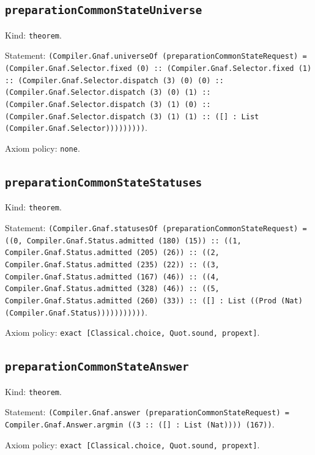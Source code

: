 \documentclass[11pt]{article}
\begin{document}
\subsection*{\texttt{preparationCommonStateUniverse}}
\noindent Kind: \texttt{theorem}.\par
\noindent Statement: \texttt{(Compiler.Gnaf.universeOf (preparationCommonStateRequest) = (Compiler.Gnaf.Selector.fixed (0) :: (Compiler.Gnaf.Selector.fixed (1) :: (Compiler.Gnaf.Selector.dispatch (3) (0) (0) :: (Compiler.Gnaf.Selector.dispatch (3) (0) (1) :: (Compiler.Gnaf.Selector.dispatch (3) (1) (0) :: (Compiler.Gnaf.Selector.dispatch (3) (1) (1) :: ([] : List (Compiler.Gnaf.Selector)))))))))}.\par
\noindent Axiom policy: \texttt{none}.\par
\subsection*{\texttt{preparationCommonStateStatuses}}
\noindent Kind: \texttt{theorem}.\par
\noindent Statement: \texttt{(Compiler.Gnaf.statusesOf (preparationCommonStateRequest) = ((0, Compiler.Gnaf.Status.admitted (180) (15)) :: ((1, Compiler.Gnaf.Status.admitted (205) (26)) :: ((2, Compiler.Gnaf.Status.admitted (235) (22)) :: ((3, Compiler.Gnaf.Status.admitted (167) (46)) :: ((4, Compiler.Gnaf.Status.admitted (328) (46)) :: ((5, Compiler.Gnaf.Status.admitted (260) (33)) :: ([] : List ((Prod (Nat) (Compiler.Gnaf.Status)))))))))))}.\par
\noindent Axiom policy: \texttt{exact [Classical.choice, Quot.sound, propext]}.\par
\subsection*{\texttt{preparationCommonStateAnswer}}
\noindent Kind: \texttt{theorem}.\par
\noindent Statement: \texttt{(Compiler.Gnaf.answer (preparationCommonStateRequest) = Compiler.Gnaf.Answer.argmin ((3 :: ([] : List (Nat)))) (167))}.\par
\noindent Axiom policy: \texttt{exact [Classical.choice, Quot.sound, propext]}.\par
\end{document}
